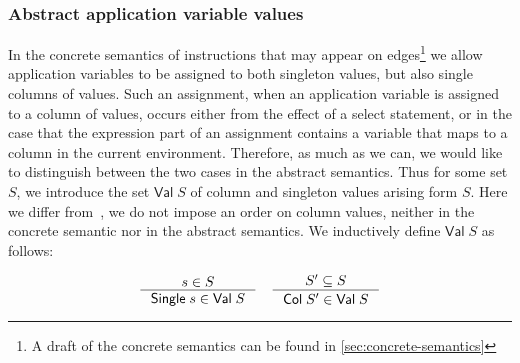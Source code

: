 \subsubsection{Abstract application variable values}
In the concrete semantics of instructions that may appear on edges\footnote{A draft of the concrete semantics can be found in \autoref{sec:concrete-semantics}} we allow application variables to be assigned to both singleton values, but also single columns of values.
Such an assignment, when an application variable is assigned to a column of values, occurs either from the effect of a select statement, or in the case that the expression part of an assignment contains a variable that maps to a column in the current environment.
Therefore, as much as we can, we would like to distinguish between the two cases in the abstract semantics.
Thus for some set $S$, we introduce the set $\mathsf{Val} \; S$ of column and singleton values arising form $S$.
Here we differ from~\cite{halder_abstract_2012}, we do not impose an order on column values, neither in the concrete semantic nor in the abstract semantics.
We inductively define $\mathsf{Val} \; S$ as follows:

\begin{gather*}
    \inference{s \in S}{\mathsf{Single} \; s \in \mathsf{Val} \; S} \quad
    \inference{S' \subseteq S}{\mathsf{Col} \; S' \in \mathsf{Val} \; S}
\end{gather*}


